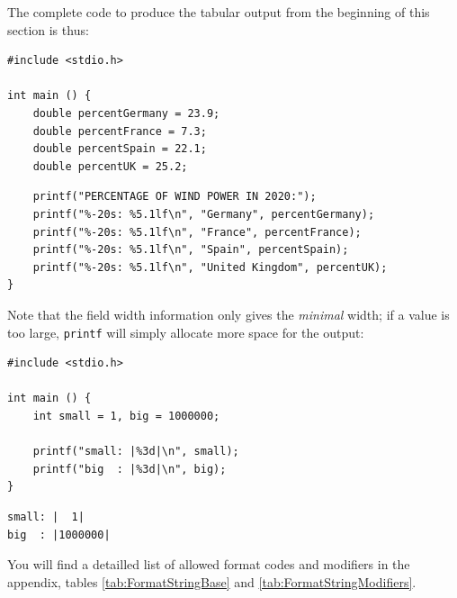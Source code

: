 {{{{The complete code to produce the tabular output from the beginning of this section is thus:
\begin{codebox}[autoalignedOutput.c]
\begin{verbatim}
#include <stdio.h>

int main () {
    double percentGermany = 23.9;
    double percentFrance = 7.3;
    double percentSpain = 22.1;
    double percentUK = 25.2;
\end{verbatim}
\end{codebox}
%
\begin{codebox}[]
\begin{verbatim}
    printf("PERCENTAGE OF WIND POWER IN 2020:");
    printf("%-20s: %5.1lf\n", "Germany", percentGermany);
    printf("%-20s: %5.1lf\n", "France", percentFrance);
    printf("%-20s: %5.1lf\n", "Spain", percentSpain);
    printf("%-20s: %5.1lf\n", "United Kingdom", percentUK);
}
\end{verbatim}
\end{codebox}

Note that the field width information only gives the \emph{minimal} width; if a value is too large, \texttt{printf} will simply allocate more space for the output:
\begin{tcbraster}[raster columns=2,
                  raster equal height,
                  nobeforeafter,
                  raster column skip=0.2cm]
\begin{codebox}[oversizedOutput.c]
\begin{verbatim}
#include <stdio.h>

int main () {
    int small = 1, big = 1000000;

    printf("small: |%3d|\n", small);
    printf("big  : |%3d|\n", big);
}
\end{verbatim}
\end{codebox}
%
\begin{cmdbox}
\begin{verbatim}
small: |  1|
big  : |1000000|
\end{verbatim}
\end{cmdbox}
\end{tcbraster}

You will find a detailled list of allowed format codes and modifiers in the appendix, tables \ref{tab:FormatStringBase} and \ref{tab:FormatStringModifiers}.

}}}}
